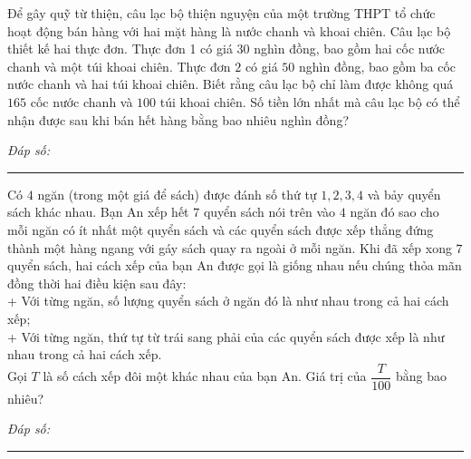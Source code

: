\documentclass{exam}
\begin{document}
\begin{question}
Để gây quỹ từ thiện, câu lạc bộ thiện nguyện của một trường THPT tổ chức hoạt động bán hàng với hai mặt hàng là nước chanh và khoai chiên. Câu lạc bộ thiết kế hai thực đơn. Thực đơn 1 có giá $30$ nghìn đồng, bao gồm hai cốc nước chanh và một túi khoai chiên. Thực đơn $2$ có giá $50$ nghìn đồng, bao gồm ba cốc nước chanh và hai túi khoai chiên. Biết rằng câu lạc bộ chỉ làm được không quá $165$ cốc nước chanh và $100$ túi khoai chiên. Số tiền lớn nhất mà câu lạc bộ có thể nhận được sau khi bán hết hàng bằng bao nhiêu nghìn đồng?
\par\vspace{0.25em}
\noindent\textit{Đáp số:}\ \rule{4.2cm}{0.4pt}
\end{question}





\begin{question}
Có $4$ ngăn (trong một giá để sách) được đánh số thứ tự $1,2,3,4$ và bảy quyển sách khác nhau. Bạn An xếp hết $7$ quyển sách nói trên vào $4$ ngăn đó sao cho mỗi ngăn có ít nhất một quyển sách và các quyển sách được xếp thẳng đứng thành một hàng ngang với gáy sách quay ra ngoài ở mỗi ngăn. Khi đã xếp xong $7$ quyển sách, hai cách xếp của bạn An được gọi là giống nhau nếu chúng thỏa mãn đồng thời hai điều kiện sau đây:\\
+ Với từng ngăn, số lượng quyển sách ở ngăn đó là như nhau trong cả hai cách xếp;\\
+ Với từng ngăn, thứ tự từ trái sang phải của các quyển sách được xếp là như nhau trong cả hai cách xếp.\\
Gọi $T$ là số cách xếp đôi một khác nhau của bạn An. Giá trị của $\dfrac{T}{100}$ bằng bao nhiêu?
\par\vspace{0.25em}
\noindent\textit{Đáp số:}\ \rule{4.2cm}{0.4pt}
\end{question}
\end{document}
